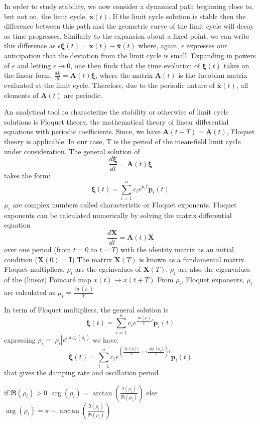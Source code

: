 In order to study stability, we now consider a dynamical path beginning close to, but not on, the limit cycle, $\mathbf{\bar{x}}(t)$. If the limit cycle solution is stable then the difference between this path and the geometric curve of the limit cycle will decay as time progresses.  Similarly to the expansion about a fixed point, we can write this difference as $\epsilon \mathbf{\xi}(t) = \mathbf{x}(t) - \mathbf{\bar{x}}(t)$  where, again, $\epsilon$ expresses our anticipation that the deviation from the limit cycle is small. Expanding in powers of $\epsilon$ and letting $\epsilon \to 0$, one then finds that the time evolution of $\mathbf{\xi}(t)$ takes on the linear form, $\frac{d\mathbf{\xi}}{dt} = \mathbf{A}(t) \mathbf{\xi}$, where the matrix $\mathbf{A}(t)$ is the Jacobian matrix evaluated at the limit cycle. 
Therefore, due to the periodic nature of $\mathbf{\bar{x}}(t)$, all elements of $\mathbf{A}(t)$ are periodic.

An analytical tool to characterize the stability or otherwise of limit cycle solutions is Floquet theory, the mathematical theory of linear differential equations with periodic coefficients. Since, we have $\mathbf{A}(t+T)= \mathbf{A}(t)$, Floquet theory is applicable. In our case, T is the period of the mean-field limit cycle under consideration.
The general solution of
$$\frac{d\mathbf{\xi}}{dt} = \mathbf{A}(t) \mathbf{\xi}$$
takes the form:
$$\mathbf{\xi}(t) = \sum_{i=1}^n c_i e^{\mu_i t} \mathbf{p}_i(t)$$
$\mu_i$ are complex numbers called characteristic or Floquet exponents.
Floquet exponents can be calculated numerically by solving the matrix differential equation
$$\frac{d\mathbf{X}}{dt} = \mathbf{A}(t) \mathbf{X}$$
over one period (from $t=0$ to $t=T$) with the identity matrix as an initial condition ($\mathbf{X}(0)=\mathbf{I}$)
The matrix $\mathbf{X}(T)$ is known as a fundamental matrix.
Floquet multipliers, $\rho_i$ are the egeinvalues of $\mathbf{X}(T)$. 
$\rho_i$ are also the eigenvalues of the (linear) Poincaré map $x(t) \rightarrow x(t+T)$
From $\rho_i$, Floquet exponents, $\mu_i$ are calculated as $\mu_i= \frac{\ln(\rho_i)}{T}$

In term of Floquet multipliers, the general solution is
$$\mathbf{\xi}(t) = \sum_{i=1}^n c_i e^{\frac{\ln(\rho_i)}{T} t} \mathbf{p}_i(t)$$
expressing $\rho_i= |\rho_i|e^{i \arg(\rho_i)}$ we have:
$$\mathbf{\xi}(t) = \sum_{i=1}^n c_i e^{(\frac{\ln(|\rho_i|)}{T}+ i \frac{\arg(\rho_i)}{T}) t} \mathbf{p}_i(t)$$
that gives the damping rate and oscillation period

if $\Re(\rho_i)>0$ $\arg(\rho_i)= \arctan(\frac{\Im(\rho_i)}{\Re(\rho_i)})$
else $\arg(\rho_i)= \pi- \arctan(\frac{\Im(\rho_i)}{\Re(\rho_i)})$


